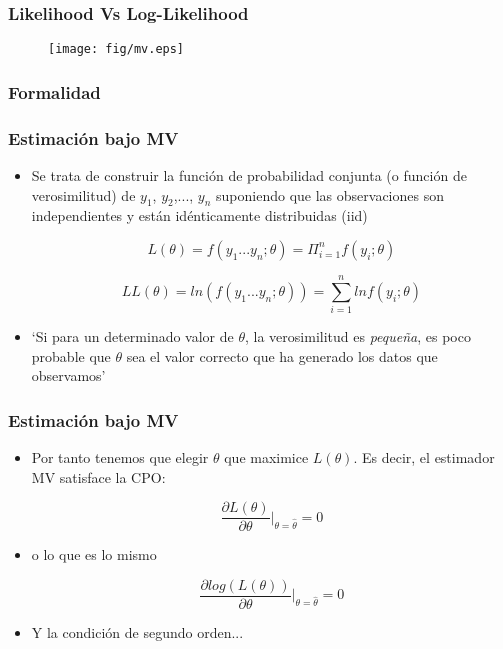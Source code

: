 \begin{frame}
	\frametitle{Likelihood Vs Log-Likelihood}
	\begin{figure}[H]
		\begin{centering}
			\texttt{[image: fig/mv.eps]}
		\end{centering}
	\end{figure}
\end{frame}

\subsubsection{Formalidad}

\begin{frame}
	\frametitle{Estimación bajo MV}
	\begin{itemize}
		\item Se trata de construir la función de probabilidad
		conjunta (o función de verosimilitud) de $y_1$, $y_2$,...,
		$y_n$ suponiendo que las observaciones son independientes y
		están idénticamente distribuidas (iid)
		
		$$L(\theta)=f(y_1... y_n; \theta)=\Pi_{i=1}^n f(y_i;\theta)$$
		
		$$LL(\theta)=ln(f(y_1... y_n; \theta))=\sum_{i=1}^n ln f(y_i;\theta)$$
		
		\item `Si para un determinado valor de $\theta$, la
		verosimilitud es \emph{pequeña}, es poco probable que $\theta$ sea el valor correcto que ha generado los
		datos que observamos'
	\end{itemize}
\end{frame}

\begin{frame}
	\frametitle{Estimación bajo MV}
	\begin{itemize}
		\item Por tanto tenemos que elegir $\theta$ que maximice
		$L(\theta)$. Es decir, el estimador MV satisface la CPO:
		
		$$\frac{\partial L(\theta)}{\partial \theta}|_{\theta=\hat\theta}=0$$
		
		\item o lo que es lo mismo
		
		$$\frac{\partial log (L(\theta))}{\partial
			\theta}|_{\theta=\hat\theta}=0$$
		
		\item Y la condición de segundo orden...
	\end{itemize}
\end{frame}

